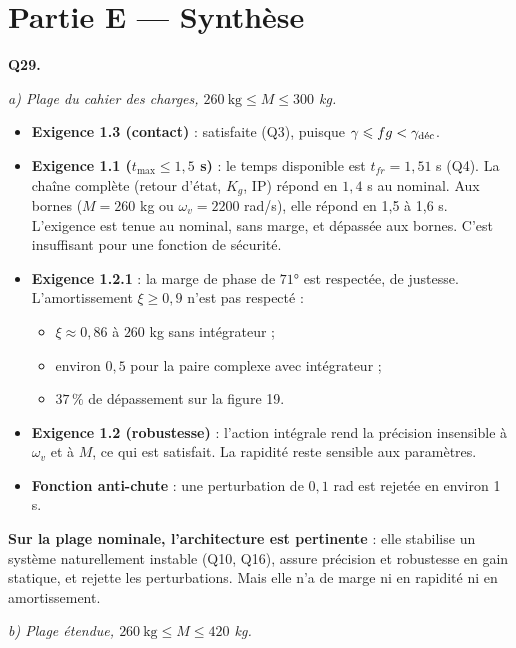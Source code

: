 \documentclass[11pt,a4paper]{article}
\providecommand{\tightlist}{\setlength{\itemsep}{0pt}\setlength{\parskip}{0pt}}
\renewcommand{\leq}{\leqslant}
\renewcommand{\geq}{\geqslant}
\begin{document}
\hypertarget{partie-e-synthuxe8se}{%
\section{Partie E --- Synthèse}\label{partie-e-synthuxe8se}}

\textbf{Q29.}

\emph{a) Plage du cahier des charges, \(260\ \text{kg}\leq M\leq300\) kg.}

\begin{itemize}
\tightlist
\item
  \textbf{Exigence 1.3 (contact)} : satisfaite (Q3), puisque \(\gamma\leq fg<\gamma_{\text{\text{déc}}}\).
\item
  \textbf{Exigence 1.1 (\(t_{\max}\leq1{,}5\) s)} : le temps disponible est \(t_{fr}=1{,}51\) s (Q4). La chaîne complète (retour d'état, \(K_g\), IP) répond en \(1{,}4\) s au nominal. Aux bornes (\(M=260\) kg ou \(\omega_v=2200\) rad/s), elle répond en 1,5 à 1,6 s. L'exigence est tenue au nominal, sans marge, et dépassée aux bornes. C'est insuffisant pour une fonction de sécurité.
\item
  \textbf{Exigence 1.2.1} : la marge de phase de \(71°\) est respectée, de justesse. L'amortissement \(\xi\geq0{,}9\) n'est pas respecté :

  \begin{itemize}
  \tightlist
  \item
    \(\xi\approx0{,}86\) à \(260\) kg sans intégrateur ;
  \item
    environ \(0{,}5\) pour la paire complexe avec intégrateur ;
  \item
    \(37\,\%\) de dépassement sur la figure 19.
  \end{itemize}
\item
  \textbf{Exigence 1.2 (robustesse)} : l'action intégrale rend la précision insensible à \(\omega_v\) et à \(M\), ce qui est satisfait. La rapidité reste sensible aux paramètres.
\item
  \textbf{Fonction anti-chute} : une perturbation de \(0{,}1\) rad est rejetée en environ 1 s.
\end{itemize}

\textbf{Sur la plage nominale, l'architecture est pertinente} : elle stabilise un système naturellement instable (Q10, Q16), assure précision et robustesse en gain statique, et rejette les perturbations. Mais elle n'a de marge ni en rapidité ni en amortissement.

\emph{b) Plage étendue, \(260\ \text{kg}\leq M\leq420\) kg.}
\end{document}
